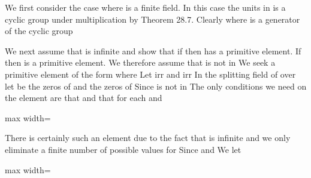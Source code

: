 \documentclass[11pt,oneside]{article}
\begin{document}
\begin{BookBody}

 We first consider the case where  is a finite field. In this case  the units in  is a cyclic group under multiplication by Theorem 28.7. Clearly  where \BookInline{\alpha } is a generator of the cyclic group 

We next assume that  is infinite and show that if  then  has a primitive element. If  then \BookInline{\beta } is a primitive element. We therefore assume that \BookInline{\gamma } is not in  We seek a primitive element of the form  where  Let  irr and  irr In the splitting field of  over  let  be the zeros of  and  the zeros of  Since \BookInline{\gamma } is not in  The only conditions we need on the element  are that  and that for each  and 

\begin{center}\begin{adjustbox}{max width=\linewidth}\end{adjustbox}\end{center}

\noindent There is certainly such an element  due to the fact that  is infinite and we only eliminate a finite number of possible values for  Since  and  We let

\begin{center}\begin{adjustbox}{max width=\linewidth}\end{adjustbox}\end{center}


\end{BookBody}
\end{document}
